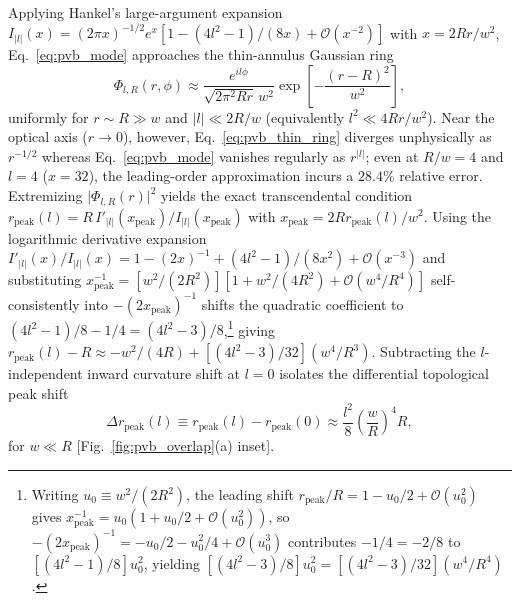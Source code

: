 \documentclass[aps,pra,onecolumn,notitlepage,11pt,tightenlines,nofootinbib,floatfix,longbibliography]{revtex4-2}
\theoremstyle{remark}
\newcommand{\abs}[1]{\lvert #1 \rvert}
\begin{document}
Applying Hankel's large-argument expansion $I_{\abs{l}}(x) = (2\pi x)^{-1/2} e^x [1 - (4l^2 - 1)/(8x) + \mathcal{O}(x^{-2})]$ with $x = 2Rr/w^2$, Eq.~\eqref{eq:pvb_mode} approaches the thin-annulus Gaussian ring~\cite{Ferreira2026}
\begin{equation}
\Phi_{l,R}(r,\phi) \approx \frac{e^{il\phi}}{\sqrt{2\pi^2 Rr}\,w^2} \exp\!\left[-\frac{(r - R)^2}{w^2}\right],
\label{eq:pvb_thin_ring}
\end{equation}
uniformly for $r \sim R \gg w$ and $\abs{l} \ll 2R/w$ (equivalently $l^2 \ll 4Rr/w^2$). Near the optical axis ($r \to 0$), however, Eq.~\eqref{eq:pvb_thin_ring} diverges unphysically as $r^{-1/2}$ whereas Eq.~\eqref{eq:pvb_mode} vanishes regularly as $r^{\abs{l}}$; even at $R/w = 4$ and $l = 4$ ($x = 32$), the leading-order approximation incurs a $28.4\%$ relative error. Extremizing $\abs{\Phi_{l,R}(r)}^2$ yields the exact transcendental condition $r_{\mathrm{peak}}(l) = R\,I'_{\abs{l}}(x_{\mathrm{peak}})/I_{\abs{l}}(x_{\mathrm{peak}})$ with $x_{\mathrm{peak}} = 2R r_{\mathrm{peak}}(l)/w^2$. Using the logarithmic derivative expansion $I'_{\abs{l}}(x)/I_{\abs{l}}(x) = 1 - (2x)^{-1} + (4l^2 - 1)/(8x^2) + \mathcal{O}(x^{-3})$ and substituting $x_{\mathrm{peak}}^{-1} = [w^2/(2R^2)][1 + w^2/(4R^2) + \mathcal{O}(w^4/R^4)]$ self-consistently into $-(2x_{\mathrm{peak}})^{-1}$ shifts the quadratic coefficient to $(4l^2 - 1)/8 - 1/4 = (4l^2 - 3)/8$,\footnote{Writing $u_0 \equiv w^2/(2R^2)$, the leading shift $r_{\mathrm{peak}}/R = 1 - u_0/2 + \mathcal{O}(u_0^2)$ gives $x_{\mathrm{peak}}^{-1} = u_0(1 + u_0/2 + \mathcal{O}(u_0^2))$, so $-(2x_{\mathrm{peak}})^{-1} = -u_0/2 - u_0^2/4 + \mathcal{O}(u_0^3)$ contributes $-1/4 = -2/8$ to $[(4l^2 - 1)/8]u_0^2$, yielding $[(4l^2 - 3)/8]u_0^2 = [(4l^2 - 3)/32](w^4/R^4)$.} giving $r_{\mathrm{peak}}(l) - R \approx -w^2/(4R) + [(4l^2 - 3)/32](w^4/R^3)$. Subtracting the $l$-independent inward curvature shift at $l = 0$ isolates the differential topological peak shift
\begin{equation}
\Delta r_{\mathrm{peak}}(l) \equiv r_{\mathrm{peak}}(l) - r_{\mathrm{peak}}(0) \approx \frac{l^2}{8}\left(\frac{w}{R}\right)^4 R,
\label{eq:peak_shift}
\end{equation}
for $w \ll R$ [Fig.~\ref{fig:pvb_overlap}(a) inset].
\end{document}
